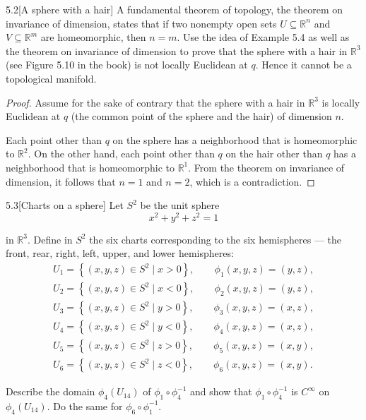 \begin{problem}{5.2}[A sphere with a hair]
A fundamental theorem of topology, the theorem on invariance of dimension, states that if two nonempty open sets \( U \subseteq \mathbb{R}^{n} \) and \( V \subseteq \mathbb{R}^{m} \) are homeomorphic, then \( n = m \). Use the idea of Example 5.4 as well as the theorem on invariance of dimension to prove that the sphere with a hair in \( \mathbb{R}^{3} \) (see Figure 5.10 in the book) is not locally Euclidean at \( q \). Hence it cannot be a topological manifold.
\end{problem}

\begin{proof}
    Assume for the sake of contrary that the sphere with a hair in \( \mathbb{R}^{3} \) is locally Euclidean at \( q \) (the common point of the sphere and the hair) of dimension \( n \).

    Each point other than \( q \) on the sphere has a neighborhood that is homeomorphic to \( \mathbb{R}^{2} \). On the other hand, each point other than \( q \) on the hair other than \( q \) has a neighborhood that is homeomorphic to \( \mathbb{R}^{1} \). From the theorem on invariance of dimension, it follows that \( n = 1 \) and \( n = 2 \), which is a contradiction.
\end{proof}

\begin{problem}{5.3}[Charts on a sphere]
Let \( S^{2} \) be the unit sphere
\[
    x^{2} + y^{2} + z^{2} = 1
\]

in \( \mathbb{R}^{3} \). Define in \( S^{2} \) the six charts corresponding to the six hemispheres --- the front, rear, right, left, upper, and lower hemispheres:
\begin{align*}
    U_{1} = \left\{ (x, y, z) \in S^{2} \mid x > 0 \right\}, \qquad \phi_{1}(x, y, z) = (y, z), \\
    U_{2} = \left\{ (x, y, z) \in S^{2} \mid x < 0 \right\}, \qquad \phi_{2}(x, y, z) = (y, z), \\
    U_{3} = \left\{ (x, y, z) \in S^{2} \mid y > 0 \right\}, \qquad \phi_{3}(x, y, z) = (x, z), \\
    U_{4} = \left\{ (x, y, z) \in S^{2} \mid y < 0 \right\}, \qquad \phi_{4}(x, y, z) = (x, z), \\
    U_{5} = \left\{ (x, y, z) \in S^{2} \mid z > 0 \right\}, \qquad \phi_{5}(x, y, z) = (x, y), \\
    U_{6} = \left\{ (x, y, z) \in S^{2} \mid z < 0 \right\}, \qquad \phi_{6}(x, y, z) = (x, y).
\end{align*}

Describe the domain \( \phi_{4}(U_{14}) \) of \( \phi_{1} \circ \phi_{4}^{-1} \) and show that \( \phi_{1} \circ \phi_{4}^{-1} \) is \( C^{\infty} \) on \( \phi_{4}(U_{14}) \). Do the same for \( \phi_{6} \circ \phi_{1}^{-1} \).
\end{problem}

